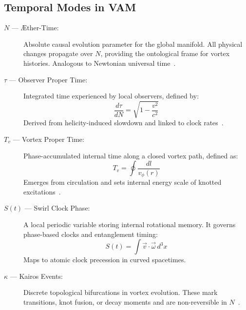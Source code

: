 \documentclass[preprint]{revtex4-2}
\begin{document}
            \subsection*{Temporal Modes in VAM}
            \begin{description}
                \item[$N$ — Æther-Time:] Absolute causal evolution parameter for the global manifold. All physical changes propagate over $N$, providing the ontological frame for vortex histories. Analogous to Newtonian universal time~\cite{volovik2003universe, ranada1990topological}.
        
                \item[$\tau$ — Observer Proper Time:] Integrated time experienced by local observers, defined by:
                \[
                \frac{d\tau}{dN} = \sqrt{1 - \frac{v^2}{c^2}}
                \]
                Derived from helicity-induced slowdown and linked to clock rates~\cite{moffatt1969knottedness}.
        
                \item[$T_v$ — Vortex Proper Time:] Phase-accumulated internal time along a closed vortex path, defined as:
                \[
                T_v = \oint \frac{dl}{v_\phi(r)}
                \]
                Emerges from circulation and sets internal energy scale of knotted excitations~\cite{volovik2003universe}.
        
                \item[$S(t)$ — Swirl Clock Phase:] A local periodic variable storing internal rotational memory. It governs phase-based clocks and entanglement timing:
                \[
                S(t) = \int \vec{v} \cdot \vec{\omega} \, d^3x
                \]
                Maps to atomic clock precession in curved spacetimes.
        
                \item[$\kappa$ — Kairos Events:] Discrete topological bifurcations in vortex evolution. These mark transitions, knot fusion, or decay moments and are non-reversible in $N$~\cite{kleckner2013knots, moffatt1969knottedness}.
            \end{description}
        
\end{document}
